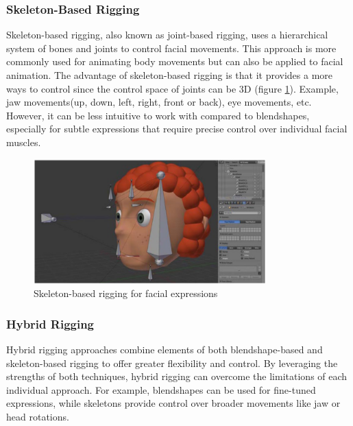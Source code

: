 \documentclass[../../main.tex]{subfiles}
\begin{document}
\subsubsection{Skeleton-Based Rigging}
\label{ch:facial_expressions:related_work:face_rigging:skeleton_based_rigging}

Skeleton-based rigging, also known as joint-based rigging, uses a hierarchical system of bones and joints to control facial movements. This approach is more commonly used for animating body movements but can also be applied to facial animation. The advantage of skeleton-based rigging is that it provides a more ways to control since the control space of joints can be 3D (figure \ref{fig:skeleton_based_rigging}). Example, jaw movements(up, down, left, right, front or back), eye movements, etc. However, it can be less intuitive to work with compared to blendshapes, especially for subtle expressions that require precise control over individual facial muscles.

\begin{figure}
    \centering
    \includegraphics[width=0.8\textwidth]{chapters/facial_expressions/images/skeleton_based_rigging.png}
    \caption{Skeleton-based rigging for facial expressions}
    \label{fig:skeleton_based_rigging}
\end{figure}

\subsubsection{Hybrid Rigging}
\label{ch:facial_expressions:related_work:face_rigging:hybrid_rigging}

Hybrid rigging approaches combine elements of both blendshape-based and skeleton-based rigging to offer greater flexibility and control. By leveraging the strengths of both techniques, hybrid rigging can overcome the limitations of each individual approach. For example, blendshapes can be used for fine-tuned expressions, while skeletons provide control over broader movements like jaw or head rotations. 
\end{document}
